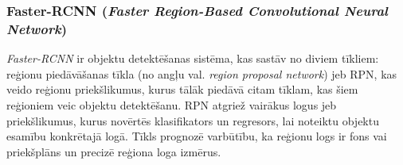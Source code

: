 \subsubsection{Faster-RCNN (\textit{Faster Region-Based Convolutional Neural Network})}
\textit{Faster-RCNN} ir objektu detektēšanas sistēma, kas sastāv no diviem tīkliem: reģionu piedāvāšanas tīkla (no angļu val. \textit{region proposal network}) jeb RPN, kas veido reģionu priekšlikumus, kurus tālāk piedāvā citam tīklam, kas šiem reģioniem veic objektu detektēšanu. RPN atgriež vairākus logus jeb priekšlikumus, kurus novērtēs klasifikators un regresors, lai noteiktu objektu esamību konkrētajā logā. Tīkls prognozē varbūtību, ka reģionu logs ir fons vai priekšplāns un precizē reģiona loga izmērus. 

